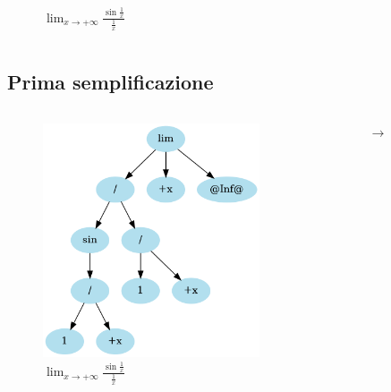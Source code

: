 \documentclass[aspectratio=149]{beamer}
\begin{document}
\begin{frame}
\begin{columns}
\begin{column}{0.45\textwidth}
\begin{figure}
					\caption{\(\lim_{x \to +\infty}{\frac{\sin{\frac{1}{x}}}{\frac{1}{x}}}\)}
				\end{figure}
			\end{column}
		\end{columns}
	\end{frame}

	\subsection{Prima semplificazione}
	
	\begin{frame}
		\begin{columns}
			\begin{column}{0.45\textwidth}
				\begin{figure}
					\includegraphics[width=0.8\textwidth]{pres_img/riformulato.png}
					\caption{\(\lim_{x \to +\infty}{\frac{\sin{\frac{1}{x}}}{\frac{1}{x}}}\)}
				\end{figure}
			\end{column}
			\begin{column}{0.1\textwidth}
				\begin{center}
					$\rightarrow$
				\end{center}
			\end{column}
			\begin{column}{0.45\textwidth}
				\begin{figure}

\end{figure}
\end{column}
\end{columns}
\end{frame}
\end{document}
